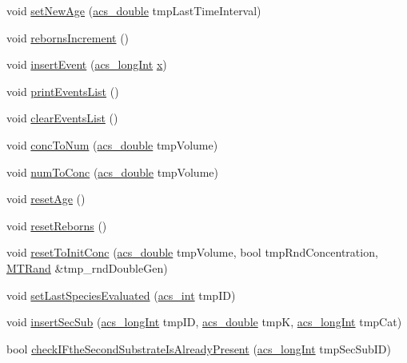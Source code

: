 \begin{DoxyCompactItemize}
\item 
void \hyperlink{a00021_aa73ab15fb28aefd3b0c6b19e7c9bb944}{set\+New\+Age} (\hyperlink{a00050_ab776853a005fcbf56af0424a2a4dd607}{acs\+\_\+double} tmp\+Last\+Time\+Interval)
\item 
void \hyperlink{a00021_a90d5fc1d90637f2245e8b0ecf228ddfa}{reborns\+Increment} ()
\item 
void \hyperlink{a00021_ad79b25968e6afcbe37624bebd46b2609}{insert\+Event} (\hyperlink{a00050_a19319d75f02db4308bc5c0026d98cd85}{acs\+\_\+long\+Int} \hyperlink{a00031_a7265972fe485274cfff77a9bb07b8fce}{x})
\item 
void \hyperlink{a00021_adb9034fecf662567aec4418d41769543}{print\+Events\+List} ()
\item 
void \hyperlink{a00021_a625274ee9a1b299cfdf0f84888b1353e}{clear\+Events\+List} ()
\item 
void \hyperlink{a00021_a9842732a5dbe0eb67e24148b5d7ae4a2}{conc\+To\+Num} (\hyperlink{a00050_ab776853a005fcbf56af0424a2a4dd607}{acs\+\_\+double} tmp\+Volume)
\item 
void \hyperlink{a00021_a23c19a53390142ba690d0f3db0520d05}{num\+To\+Conc} (\hyperlink{a00050_ab776853a005fcbf56af0424a2a4dd607}{acs\+\_\+double} tmp\+Volume)
\item 
void \hyperlink{a00021_a911d4db36e84690d19abb2902a734524}{reset\+Age} ()
\item 
void \hyperlink{a00021_a4884d8bce59ddb79e87e08f3ed16633f}{reset\+Reborns} ()
\item 
void \hyperlink{a00021_a86a1f6a297cd3e1c197d23bb22f2f37d}{reset\+To\+Init\+Conc} (\hyperlink{a00050_ab776853a005fcbf56af0424a2a4dd607}{acs\+\_\+double} tmp\+Volume, bool tmp\+Rnd\+Concentration, \hyperlink{a00015}{M\+T\+Rand} \&tmp\+\_\+rnd\+Double\+Gen)
\item 
void \hyperlink{a00021_a8daa007da55f042b9c436f956836f4d8}{set\+Last\+Species\+Evaluated} (\hyperlink{a00050_a8d277355641a098190360234e2ebde35}{acs\+\_\+int} tmp\+I\+D)
\item 
void \hyperlink{a00021_a0da8d53a216583f7790b12362da376a3}{insert\+Sec\+Sub} (\hyperlink{a00050_a19319d75f02db4308bc5c0026d98cd85}{acs\+\_\+long\+Int} tmp\+I\+D, \hyperlink{a00050_ab776853a005fcbf56af0424a2a4dd607}{acs\+\_\+double} tmp\+K, \hyperlink{a00050_a19319d75f02db4308bc5c0026d98cd85}{acs\+\_\+long\+Int} tmp\+Cat)
\item 
bool \hyperlink{a00021_af04a95fb2b35bf988271a60413ec508e}{check\+I\+Fthe\+Second\+Substrate\+Is\+Already\+Present} (\hyperlink{a00050_a19319d75f02db4308bc5c0026d98cd85}{acs\+\_\+long\+Int} tmp\+Sec\+Sub\+I\+D)

\end{DoxyCompactItemize}
